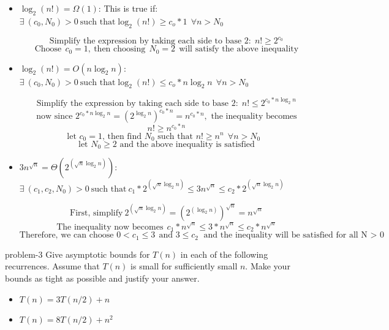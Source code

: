 \documentclass[letterpaper, 11pt]{extarticle}
\begin{document}
\begin{itemize}
    \item $\log_{2}(n!) = \Omega(1)$: This is true if: $\exists \ (c_0, N_0) > 0 \ \text{such that} \log_2(n!) \geq c_o * 1 \ \ \forall n> N_0$

        \[ 
        \text{Simplify the expression by taking each side to base 2:} \ \ n! \geq 2^{c_0}
        \]
        \[
        \text{Choose} \ \ c_0=1,\ \text{then choosing} \ \ N_0 = 2 \ \ \text{will satisfy the above inequality}
        \]


    \item $\log_{2}(n!) = O(n \log_{2}n)$: \\ $\exists \ (c_0, N_0) > 0 \ \text{such that} \log_2(n!) \leq c_o * n \log_{2}n \ \ \forall n>N_0$ 

        \[ \text{Simplify the expression by taking each side to base 2:} \ \ n! \leq 2^{c_0 * n \log_2 n} \]
        \[ \text{now since } 2^{c_0 * n \log_2 n} = (2^{\log_2 n})^{c_0 * n} = n^{c_0 * n}, \text{ the inequality becomes}\]
        \[ n! \geq n^{c_0 * n} \]
        \[ \text{let $c_0 = 1$, then find $N_0$ such that $n! \geq n^{n} \ \ \forall n > N_0$ }\]
        \[ \text{let $N_0 \geq 2$ and the above inequality is satisfied} \]
    
    \item $3n^{\sqrt{n}} = \Theta(2^{(\sqrt{n} \log_{2}n)})$: \\ $\exists \ (c_1, c_2, N_0) >0 \ \text{such that} \ c_1 * 2^{(\sqrt{n} \log_{2}n)} \leq 3n^{\sqrt{n}} \leq c_2 * 2^{(\sqrt{n} \log_{2}n)}$ 

        \[ \text{First, simplify} \ 2^{(\sqrt{n} \log_{2}n)} =  (2^{(\log_{2}n)})^{\sqrt{n}} = n^{\sqrt{n}} \]
        \[ \text{The inequality now becomes} \ \  c_1 * n^{\sqrt{n}} \leq 3*n^{\sqrt{n}} \leq c_2 * n^{\sqrt{n}} \]
        \[ \text{Therefore, we can choose  } 0 < c_1 \leq 3 \ \ \text{and } 3 \leq c_2 \text{ and the inequality will be satisfied for all N $>$ 0}\]
    
\end{itemize}

\begin{problem}{}{problem-3}
    Give asymptotic bounds for $T(n)$ in each of the following recurrences. Assume that $T(n)$ is small for sufficiently small $n$. Make your bounds as tight as possible and justify your answer.
    \begin{itemize}
        \item $T(n) = 3T(n/2) + n$
        \item $T(n) = 8T(n/2) + n^2$
    \end{itemize}
\end{problem}
\end{document}
